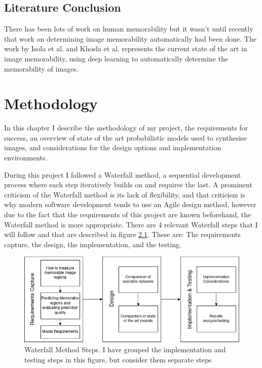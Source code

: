 \documentclass{UoYCSproject}
\begin{document}
\section{Literature Conclusion}

There has been lots of work on human memorability but it wasn't until recently that work on determining image memorability automatically had been done. The work by Isola et al. \cite{Isola2011,IsolaParikhTorralbaOliva2011} and Khosla et al. \cite{ICCV15_Khosla} represents the current state of the art in image memorability, using deep learning to automatically determine the memorability of images.

\chapter{Methodology}


In this chapter I describe the methodology of my project, the requirements for success, an overview of state of the art probabilistic models used to synthesise images, and considerations for the design options and implementation environments. 

During this project I followed a Waterfall method, a sequential development process where each step iteratively builds on and requires the last. A prominent criticism of the Waterfall method is its lack of flexibility, and that criticism is why modern software development tends to use an Agile design method, however due to the fact that the requirements of this project are known beforehand, the Waterfall method is more appropriate. There are 4 relevant Waterfall steps that I will follow and that are described in figure \ref{fig:waterfall method}. These are: The requirements capture, the design, the implementation, and the testing.

\begin{figure}[ht]
    \centering
    \includegraphics[width=\linewidth]{Waterfall Model}
    \caption{Waterfall Method Steps. I have grouped the implementation and testing steps in this figure, but consider them separate steps}
    \label{fig:waterfall method}
\end{figure}
\end{document}
